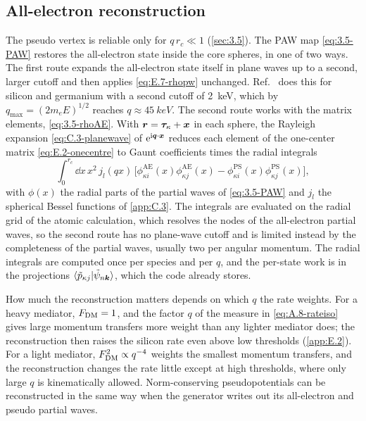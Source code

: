 \subsection{All-electron reconstruction}

The pseudo vertex is reliable only for $q\,r_c \ll 1$ (\cref{sec:3.5}). The PAW map \cref{eq:3.5-PAW} restores the all-electron state inside the core spheres, in one of two ways. The first route expands the all-electron state itself in plane waves up to a second, larger cutoff and then applies \cref{eq:E.7-rhopw} unchanged. Ref.~\cite[Sect.~2.1.1]{griffin2021extended} does this for silicon and germanium with a second cutoff of \SI{2}{keV}, which by $q_{\mathrm{max}} = (2m_eE)^{1/2}$ reaches $q \approx \SI{45}{keV}$. The second route works with the matrix elements, \cref{eq:3.5-rhoAE}. With $\bm{r} = \bm{\tau}_\kappa + \bm{x}$ in each sphere, the Rayleigh expansion \cref{eq:C.3-planewave} of $\mathrm{e}^{\mathrm{i}\bm{q}\cdot\bm{x}}$ reduces each element of the one-center matrix \cref{eq:E.2-onecentre} to Gaunt coefficients times the radial integrals
\begin{equation}
  \int_0^{r_c}\dd x\,x^2\,j_l(qx)\,\bigl[\phi^{\mathrm{AE}}_{\kappa i}(x)\phi^{\mathrm{AE}}_{\kappa j}(x) - \phi^{\mathrm{PS}}_{\kappa i}(x)\phi^{\mathrm{PS}}_{\kappa j}(x)\bigr] ,
  \label{eq:E.7-radial}
\end{equation}
with $\phi(x)$ the radial parts of the partial waves of \cref{eq:3.5-PAW} and $j_l$ the spherical Bessel functions of \cref{app:C.3}. The integrals are evaluated on the radial grid of the atomic calculation, which resolves the nodes of the all-electron partial waves, so the second route has no plane-wave cutoff and is limited instead by the completeness of the partial waves, usually two per angular momentum. The radial integrals are computed once per species and per $q$, and the per-state work is in the projections $\langle\tilde p_{\kappa j}|\tilde\psi_{n\bm{k}}\rangle$, which the code already stores.

How much the reconstruction matters depends on which $q$ the rate weights. For a heavy mediator, $F_{\mathrm{DM}} = 1$, and the factor $q$ of the measure in \cref{eq:A.8-rateiso} gives large momentum transfers more weight than any lighter mediator does; the reconstruction then raises the silicon rate even above low thresholds (\cref{app:E.2}). For a light mediator, $F_{\mathrm{DM}}^2 \propto q^{-4}$ weights the smallest momentum transfers, and the reconstruction changes the rate little except at high thresholds, where only large $q$ is kinematically allowed. Norm-conserving pseudopotentials can be reconstructed in the same way when the generator writes out its all-electron and pseudo partial waves.

